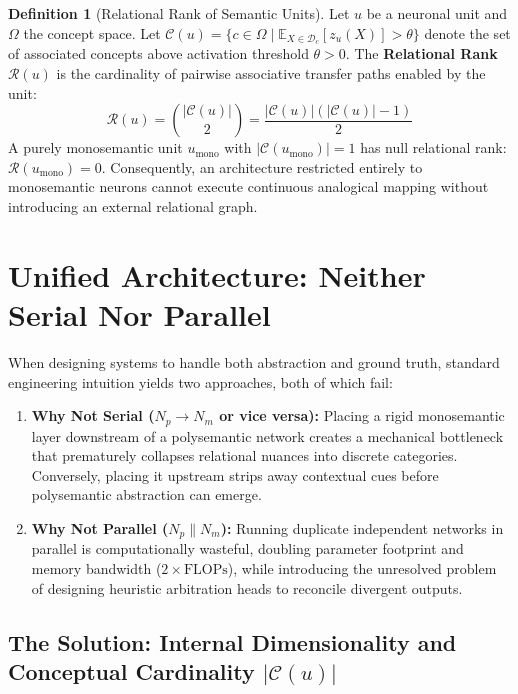 \documentclass[11pt,a4paper]{article}
\theoremstyle{definition}
\newtheorem{definition}{Definition}
\begin{document}
\begin{definition}[Relational Rank of Semantic Units]
Let $u$ be a neuronal unit and $\Omega$ the concept space. Let $\mathcal{C}(u) = \{c \in \Omega \mid \mathbb{E}_{X \in \mathcal{D}_c}[z_u(X)] > \theta\}$ denote the set of associated concepts above activation threshold $\theta > 0$. The \textbf{Relational Rank} $\mathcal{R}(u)$ is the cardinality of pairwise associative transfer paths enabled by the unit:
\begin{equation}
    \mathcal{R}(u) = \binom{|\mathcal{C}(u)|}{2} = \frac{|\mathcal{C}(u)| (|\mathcal{C}(u)| - 1)}{2}
\end{equation}
A purely monosemantic unit $u_{\mathrm{mono}}$ with $|\mathcal{C}(u_{\mathrm{mono}})| = 1$ has null relational rank: $\mathcal{R}(u_{\mathrm{mono}}) = 0$. Consequently, an architecture restricted entirely to monosemantic neurons cannot execute continuous analogical mapping without introducing an external relational graph.
\end{definition}

\section{Unified Architecture: Neither Serial Nor Parallel}

When designing systems to handle both abstraction and ground truth, standard engineering intuition yields two approaches, both of which fail:

\begin{enumerate}[leftmargin=*, itemsep=2.5pt]
    \item \textbf{Why Not Serial ($N_p \to N_m$ or vice versa):} Placing a rigid monosemantic layer downstream of a polysemantic network creates a mechanical bottleneck that prematurely collapses relational nuances into discrete categories. Conversely, placing it upstream strips away contextual cues before polysemantic abstraction can emerge.
    \item \textbf{Why Not Parallel ($N_p \parallel N_m$):} Running duplicate independent networks in parallel is computationally wasteful, doubling parameter footprint and memory bandwidth ($2\times \mathrm{FLOPs}$), while introducing the unresolved problem of designing heuristic arbitration heads to reconcile divergent outputs.
\end{enumerate}

\subsection{The Solution: Internal Dimensionality and Conceptual Cardinality \texorpdfstring{$|\mathcal{C}(u)|$}{|C(u)|}}
\end{document}
